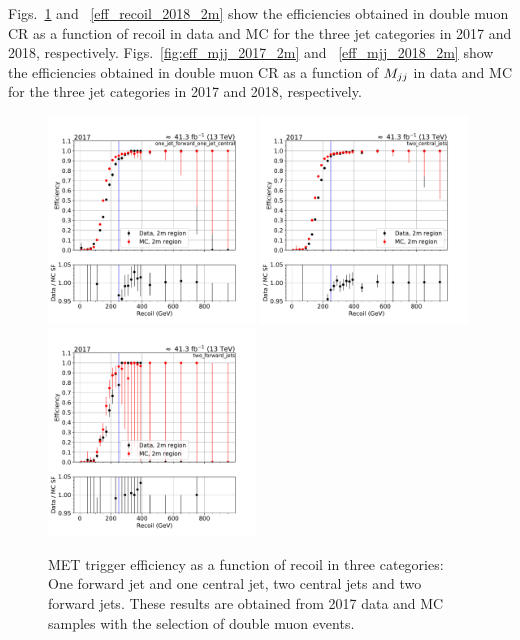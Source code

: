 Figs.~\ref{fig:eff_recoil_2017_2m} and ~\ref{eff_recoil_2018_2m} show the efficiencies obtained in double muon CR 
as a function of recoil in data and MC for the three jet categories in 2017 and 2018, respectively. 
Figs.~\ref{fig:eff_mjj_2017_2m} and ~\ref{eff_mjj_2018_2m} show the efficiencies obtained in double muon CR 
as a function of $M_{jj}$ in data and MC for the three jet categories in 2017 and 2018, respectively. 

\begin{figure}[htp]
    \begin{center}
        \includegraphics[width=0.49\textwidth]{fig/efficiency/trigger/met/recoil/data_mc_comparison_2m_2017_one_jet_forward_one_jet_central.pdf}
        \includegraphics[width=0.49\textwidth]{fig/efficiency/trigger/met/recoil/data_mc_comparison_2m_2017_two_central_jets.pdf} \\
        \includegraphics[width=0.49\textwidth]{fig/efficiency/trigger/met/recoil/data_mc_comparison_2m_2017_two_forward_jets.pdf}
    \end{center}
    \caption{MET trigger efficiency as a function of recoil in three categories: One forward jet and one central jet, two central jets and
            two forward jets. These results are obtained from 2017 data and MC samples with the selection of double muon events.} 
    \label{fig:eff_recoil_2017_2m}      
\end{figure}
